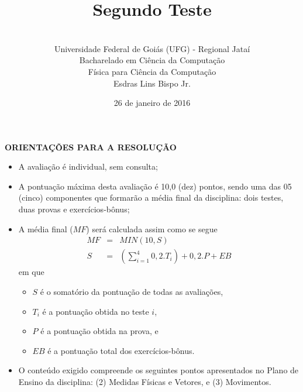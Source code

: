 \documentclass[12pt,a4paper,oneside]{article}
\author{\\Universidade Federal de Goiás (UFG) - Regional Jataí\\Bacharelado em Ciência da Computação \\Física para Ciência da Computação \\Esdras Lins Bispo Jr.}
\title{\sc \huge Segundo Teste}
\date{26 de janeiro de 2016}
\begin{document}
\maketitle

{\bf ORIENTAÇÕES PARA A RESOLUÇÃO}

\footnotesize

\begin{itemize}
	\item A avaliação é individual, sem consulta;
	\item A pontuação máxima desta avaliação é 10,0 (dez) pontos, sendo uma das 05 (cinco) componentes que formarão a média final da disciplina: dois testes, duas provas e exercícios-bônus;
	\item A média final ($MF$) será calculada assim como se segue
	\begin{eqnarray}
		MF & = & MIN(10, S) \nonumber \\
		S & = & (\sum_{i=1}^{4} 0,2.T_i ) + 0,2.P  + EB \nonumber
	\end{eqnarray}
	em que 
	\begin{itemize}
		\item $S$ é o somatório da pontuação de todas as avaliações,
		\item $T_i$ é a pontuação obtida no teste $i$,
		\item $P$ é a pontuação obtida na prova, e
		\item $EB$ é a pontuação total dos exercícios-bônus.
	\end{itemize}
	\item O conteúdo exigido compreende os seguintes pontos apresentados no Plano de Ensino da disciplina: (2) Medidas Físicas e Vetores, e (3) Movimentos.
\end{itemize}


\begin{center}
\end{center}

\newpage

\normalsize
\end{document}
